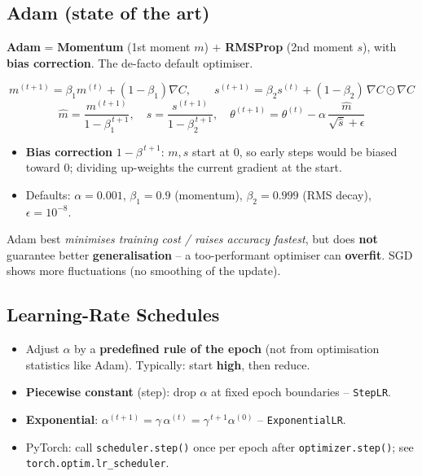 \documentclass[10pt,a4paper]{article}
\begin{document}
	\subsection{Adam (state of the art)}

	\begin{definitionbox}
		\textbf{Adam} = \textbf{Momentum} (1st moment $m$) $+$ \textbf{RMSProp} (2nd moment $s$), with \textbf{bias correction}. The de-facto default optimiser.
	\end{definitionbox}

	\begin{formulabox}
		\[
		m^{(t+1)} = \beta_1 m^{(t)} + (1-\beta_1)\nabla C, \qquad
		s^{(t+1)} = \beta_2 s^{(t)} + (1-\beta_2)\,\nabla C \odot \nabla C
		\]
		\[
		\hat m = \frac{m^{(t+1)}}{1-\beta_1^{\,t+1}}, \quad
		\hat s = \frac{s^{(t+1)}}{1-\beta_2^{\,t+1}}, \quad
		\theta^{(t+1)} = \theta^{(t)} - \alpha\,\frac{\hat m}{\sqrt{\hat s}+\epsilon}
		\]
	\end{formulabox}
	\begin{itemize}[leftmargin=*]
		\item \textbf{Bias correction} $1-\beta^{\,t+1}$: $m,s$ start at $0$, so early steps would be biased toward $0$; dividing up-weights the current gradient at the start.
		\item Defaults: $\alpha=0.001$, $\beta_1=0.9$ (momentum), $\beta_2=0.999$ (RMS decay), $\epsilon=10^{-8}$.
	\end{itemize}

	\begin{importantbox}
		Adam best \emph{minimises training cost / raises accuracy fastest}, but does \textbf{not} guarantee better \textbf{generalisation} -- a too-performant optimiser can \textbf{overfit}. SGD shows more fluctuations (no smoothing of the update).
	\end{importantbox}

	\subsection{Learning-Rate Schedules}

	\begin{itemize}[leftmargin=*]
		\item Adjust $\alpha$ by a \textbf{predefined rule of the epoch} (not from optimisation statistics like Adam). Typically: start \textbf{high}, then reduce.
		\item \textbf{Piecewise constant} (step): drop $\alpha$ at fixed epoch boundaries -- \texttt{StepLR}.
		\item \textbf{Exponential}: $\alpha^{(t+1)} = \gamma\,\alpha^{(t)} = \gamma^{\,t+1}\alpha^{(0)}$ -- \texttt{ExponentialLR}.
		\item PyTorch: call \texttt{scheduler.step()} once per epoch after \texttt{optimizer.step()}; see \texttt{torch.optim.lr\_scheduler}.
	\end{itemize}
\end{document}

